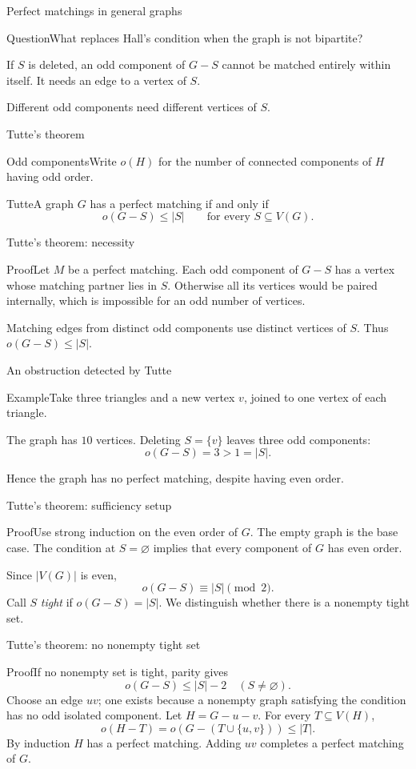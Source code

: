 \documentclass[aspectratio=169,11pt]{beamer}
\newcommand{\Def}[2]{\begin{block}{#1}#2\end{block}}
\newcommand{\Thm}[2]{\begin{block}{#1}#2\end{block}}
\renewcommand{\Proof}[1]{\begin{block}{Proof}\normalsize #1\end{block}}
\newcommand{\Question}[1]{\begin{block}{Question}#1\end{block}}
\renewcommand{\Example}[1]{\begin{block}{Example}#1\end{block}}
\newcommand{\gap}{\par\medskip}
\begin{document}
\begin{frame}{Perfect matchings in general graphs}
\large
\Question{What replaces Hall's condition when the graph is not bipartite?}
\gap If $S$ is deleted, an odd component of $G-S$ cannot be matched entirely within itself. It needs an edge to a vertex of $S$.
\gap Different odd components need different vertices of $S$.
\end{frame}
\begin{frame}{Tutte's theorem}
\large
\Def{Odd components}{Write $o(H)$ for the number of connected components of $H$ having odd order.}
\Thm{Tutte}{A graph $G$ has a perfect matching if and only if
\[o(G-S)\leq |S|\qquad\text{for every }S\subseteq V(G).\]}
\end{frame}
\begin{frame}{Tutte's theorem: necessity}
\large
\Proof{Let $M$ be a perfect matching. Each odd component of $G-S$ has a vertex whose matching partner lies in $S$. Otherwise all its vertices would be paired internally, which is impossible for an odd number of vertices.\gap Matching edges from distinct odd components use distinct vertices of $S$. Thus $o(G-S)\leq|S|$.}
\end{frame}
\begin{frame}{An obstruction detected by Tutte}
\large
\Example{Take three triangles and a new vertex $v$, joined to one vertex of each triangle.}
\gap The graph has $10$ vertices. Deleting $S=\{v\}$ leaves three odd components:
\[o(G-S)=3>1=|S|.\]
\gap Hence the graph has no perfect matching, despite having even order.
\end{frame}
\begin{frame}{Tutte's theorem: sufficiency setup}
\large
\Proof{Use strong induction on the even order of $G$. The empty graph is the base case. The condition at $S=\varnothing$ implies that every component of $G$ has even order.\gap Since $|V(G)|$ is even,
\[o(G-S)\equiv |S|\pmod2.\]
Call $S$ \emph{tight} if $o(G-S)=|S|$. We distinguish whether there is a nonempty tight set.}
\end{frame}
\begin{frame}{Tutte's theorem: no nonempty tight set}
\large
\Proof{If no nonempty set is tight, parity gives
\[o(G-S)\leq |S|-2\quad(S\ne\varnothing).\]
Choose an edge $uv$; one exists because a nonempty graph satisfying the condition has no odd isolated component. Let $H=G-u-v$. For every $T\subseteq V(H)$,
\[o(H-T)=o(G-(T\cup\{u,v\}))\leq |T|.\]
By induction $H$ has a perfect matching. Adding $uv$ completes a perfect matching of $G$.}
\end{frame}
\end{document}
